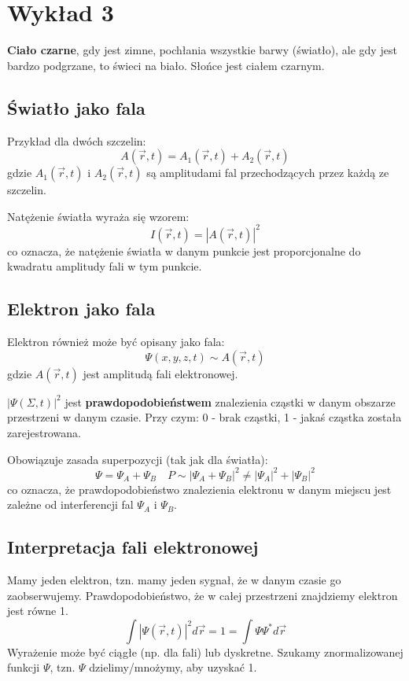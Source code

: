 \section{Wykład 3}

\textbf{Ciało czarne}, gdy jest zimne, pochłania wszystkie barwy (światło), ale gdy jest bardzo podgrzane, to świeci na biało.
Słońce jest ciałem czarnym.

\subsection{Światło jako fala}
Przykład dla dwóch szczelin:
\[
A(\vec{r}, t) = A_1(\vec{r}, t) + A_2(\vec{r}, t)
\]
gdzie $A_1(\vec{r}, t)$ i $A_2(\vec{r}, t)$ są amplitudami fal przechodzących przez każdą ze szczelin.

Natężenie światła wyraża się wzorem:
\[
I(\vec{r}, t) = |A(\vec{r}, t)|^2
\]
co oznacza, że natężenie światła w danym punkcie jest proporcjonalne do kwadratu amplitudy fali w tym punkcie.

\subsection{Elektron jako fala}
Elektron również może być opisany jako fala:
\[
\Psi(x,y,z,t) \sim A(\vec{r}, t)
\]
gdzie $A(\vec{r},t)$ jest amplitudą fali elektronowej.

$|\Psi(\Sigma, t)|^2$ jest \textbf{prawdopodobieństwem} znalezienia cząstki w danym obszarze przestrzeni w danym czasie.
Przy czym: 0 - brak cząstki, 1 - jakaś cząstka została zarejestrowana.

Obowiązuje zasada superpozycji (tak jak dla światła):
\[
\Psi = \Psi_A + \Psi_B \quad P \sim |\Psi_A + \Psi_B|^2 \neq |\Psi_A|^2 + |\Psi_B|^2
\]
co oznacza, że prawdopodobieństwo znalezienia elektronu w danym miejscu jest zależne od interferencji fal $\Psi_A$ i $\Psi_B$.

\subsection{Interpretacja fali elektronowej}
Mamy jeden elektron, tzn. mamy jeden sygnał, że w danym czasie go zaobserwujemy.
Prawdopodobieństwo, że w całej przestrzeni znajdziemy elektron jest równe 1.
\[
\int |\Psi(\vec{r}, t)|^2 d\vec{r} = 1 = \int \Psi \Psi^* d\vec{r}
\]
Wyrażenie może być ciągłe (np. dla fali) lub dyskretne.
Szukamy znormalizowanej funkcji $\Psi$, tzn. $\Psi$ dzielimy/mnożymy, aby uzyskać 1.

